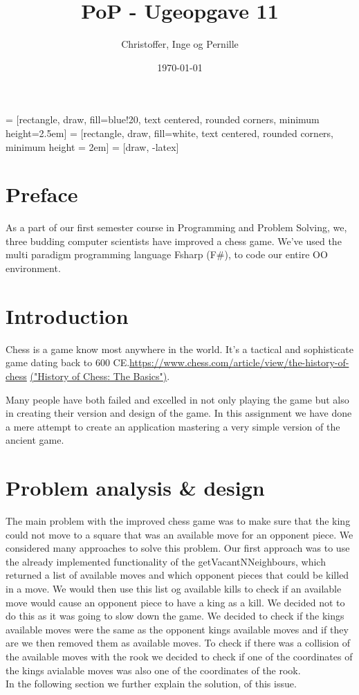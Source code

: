 \documentclass[a4paper]{report}
\title{PoP - Ugeopgave 11}
\author{Christoffer, Inge og Pernille}
\date{\today}
\begin{document}
\maketitle
{} = [rectangle, draw, fill=blue!20, text centered,
    rounded corners, minimum height=2.5em]
 = [rectangle, draw, fill=white, text centered,
    rounded corners, minimum height = 2em]
 = [draw, -latex]

\section*{Preface}
As a part of our first semester course in Programming and Problem Solving, we, three budding computer scientists have improved a chess game. We've used the multi paradigm programming language Fsharp (F\#), to code our entire OO environment.


\section*{Introduction}
Chess is a game know most anywhere in the world. It's a tactical and sophisticate game dating back to 600 CE.\url{https://www.chess.com/article/view/the-history-of-chess} \href{https://www.chess.com/article/view/the-history-of-chess}{(\textsf{"History of Chess: The Basics"})}.

Many people have both failed and excelled in not only playing the game but also in creating their version and design of the game.
In this assignment we have done a mere attempt to create an application mastering a very simple version of the ancient game.


\section*{Problem analysis \& design}
The main problem with the improved chess game was to make sure that the king could not move to a square that was an available move for an opponent piece. We considered many approaches to solve this problem.
Our first approach was to use the already implemented functionality of the getVacantNNeighbours, which returned a list of available moves and which opponent pieces that could be killed in a move. We
would then use this list og available kills to check if an available move would cause an opponent piece to have a king as a kill. We decided not to do this as it was going to slow down the game. We decided to
check if the kings available moves were the same as the opponent kings available moves and if they are we then removed them as available moves. To check if there was a collision of the available moves with the rook we
decided to check if one of the coordinates of the kings avialable moves was also one of the coordinates of the rook.\\
In the following section we further explain the solution, of this issue.\\
\end{document}
